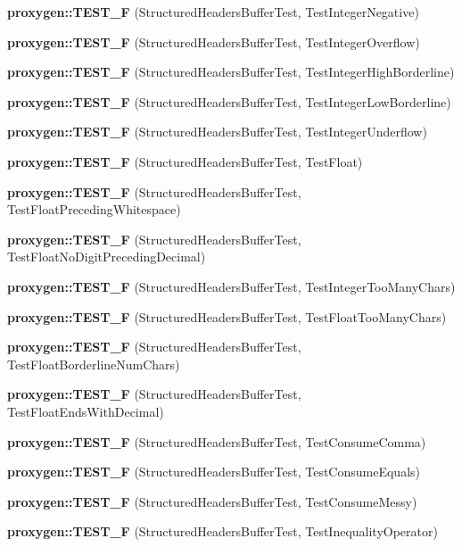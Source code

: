 \begin{DoxyCompactItemize}
\item 
{\bf proxygen\+::\+T\+E\+S\+T\+\_\+F} (Structured\+Headers\+Buffer\+Test, Test\+Integer\+Negative)
\item 
{\bf proxygen\+::\+T\+E\+S\+T\+\_\+F} (Structured\+Headers\+Buffer\+Test, Test\+Integer\+Overflow)
\item 
{\bf proxygen\+::\+T\+E\+S\+T\+\_\+F} (Structured\+Headers\+Buffer\+Test, Test\+Integer\+High\+Borderline)
\item 
{\bf proxygen\+::\+T\+E\+S\+T\+\_\+F} (Structured\+Headers\+Buffer\+Test, Test\+Integer\+Low\+Borderline)
\item 
{\bf proxygen\+::\+T\+E\+S\+T\+\_\+F} (Structured\+Headers\+Buffer\+Test, Test\+Integer\+Underflow)
\item 
{\bf proxygen\+::\+T\+E\+S\+T\+\_\+F} (Structured\+Headers\+Buffer\+Test, Test\+Float)
\item 
{\bf proxygen\+::\+T\+E\+S\+T\+\_\+F} (Structured\+Headers\+Buffer\+Test, Test\+Float\+Preceding\+Whitespace)
\item 
{\bf proxygen\+::\+T\+E\+S\+T\+\_\+F} (Structured\+Headers\+Buffer\+Test, Test\+Float\+No\+Digit\+Preceding\+Decimal)
\item 
{\bf proxygen\+::\+T\+E\+S\+T\+\_\+F} (Structured\+Headers\+Buffer\+Test, Test\+Integer\+Too\+Many\+Chars)
\item 
{\bf proxygen\+::\+T\+E\+S\+T\+\_\+F} (Structured\+Headers\+Buffer\+Test, Test\+Float\+Too\+Many\+Chars)
\item 
{\bf proxygen\+::\+T\+E\+S\+T\+\_\+F} (Structured\+Headers\+Buffer\+Test, Test\+Float\+Borderline\+Num\+Chars)
\item 
{\bf proxygen\+::\+T\+E\+S\+T\+\_\+F} (Structured\+Headers\+Buffer\+Test, Test\+Float\+Ends\+With\+Decimal)
\item 
{\bf proxygen\+::\+T\+E\+S\+T\+\_\+F} (Structured\+Headers\+Buffer\+Test, Test\+Consume\+Comma)
\item 
{\bf proxygen\+::\+T\+E\+S\+T\+\_\+F} (Structured\+Headers\+Buffer\+Test, Test\+Consume\+Equals)
\item 
{\bf proxygen\+::\+T\+E\+S\+T\+\_\+F} (Structured\+Headers\+Buffer\+Test, Test\+Consume\+Messy)
\item 
{\bf proxygen\+::\+T\+E\+S\+T\+\_\+F} (Structured\+Headers\+Buffer\+Test, Test\+Inequality\+Operator)
\end{DoxyCompactItemize}
